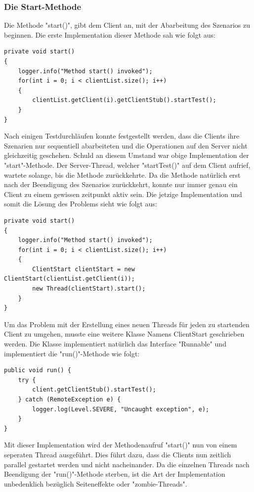 \subsubsection{Die Start-Methode}
\label{sec:startMethode}

Die Methode "start()", gibt dem Client an, mit der Abarbeitung des Szenarios zu beginnen. Die erste Implementation dieser Methode sah wie folgt aus:
\begin{lstlisting}
private void start()
{
	logger.info("Method start() invoked");
	for(int i = 0; i < clientList.size(); i++)
	{
		clientList.getClient(i).getClientStub().startTest();
	}
}
\end{lstlisting}

Nach einigen Testdurchläufen konnte festgestellt werden, dass die Clients ihre Szenarien nur sequentiell abarbeiteten und die Operationen auf den Server nicht gleichzeitig geschehen. Schuld an diesem Umstand war obige Implementation der "start"-Methode. Der Server-Thread, welcher "startTest()" auf dem Client aufrief, wartete solange, bis die Methode zurückkehrte. Da die Methode natürlich erst nach der Beendigung des Szenarios zurückkehrt, konnte nur immer genau ein Client zu einem gewissen zeitpunkt aktiv sein.\newline
Die jetzige Implementation und somit die Lösung des Problems sieht wie folgt aus:
\begin{lstlisting}
private void start()
{
	logger.info("Method start() invoked");
	for(int i = 0; i < clientList.size(); i++)
	{
		ClientStart clientStart = new ClientStart(clientList.getClient(i));
		new Thread(clientStart).start();
	}
}
\end{lstlisting}
Um das Problem mit der Erstellung eines neuen Threads für jeden zu startenden Client zu umgehen, musste eine weitere Klasse Namens ClientStart geschrieben werden. Die Klasse implementiert natürlich das Interface "Runnable" und implementiert die "run()"-Methode wie folgt:
\begin{lstlisting}
public void run() {
	try {
		client.getClientStub().startTest();
	} catch (RemoteException e) {
		logger.log(Level.SEVERE, "Uncaught exception", e);
	}
}
\end{lstlisting}

Mit dieser Implementation wird der Methodenaufruf "start()" nun von einem seperaten Thread ausgeführt. Dies führt dazu, dass die Clients nun zeitlich parallel gestartet werden und nicht nacheinander. Da die einzelnen Threads nach Beendigung der "run()"-Methode sterben, ist die Art der Implementation unbedenklich bezüglich Seiteneffekte oder "zombie-Threads".

